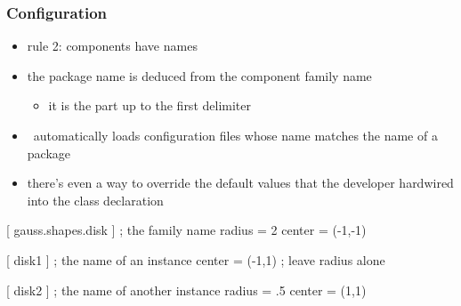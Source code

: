 \begin{frame}[fragile]
%
  \frametitle{Configuration}
%
  \begin{itemize}
  \item rule 2: components have names
  \item the package name is deduced from the component family name
    \begin{itemize}
    \item it is the part up to the first delimiter
    \end{itemize}
  \item \pyre\ automatically loads configuration files whose name matches the name of a package
  \item there's even a way to override the default values that the developer hardwired into
    the class declaration
  \end{itemize}
%
  \begin{icfg}{}
    [ gauss.shapes.disk ] ; the family name
    radius = 2
    center = (-1,-1)

    [ disk1 ] ; the name of an instance
    center = (-1,1)   ; leave {radius} alone

    [ disk2 ] ; the name of another instance
    radius = .5
    center = (1,1)
  \end{icfg}
%
\end{frame}

